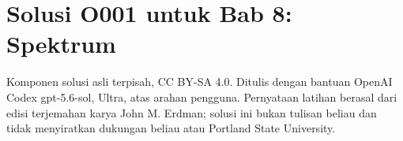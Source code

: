 
\section*{Solusi O001 untuk Bab 8: Spektrum}
\begin{center}
\small
Komponen solusi asli terpisah, CC BY-SA 4.0. Ditulis dengan bantuan
OpenAI Codex gpt-5.6-sol, Ultra, atas arahan pengguna. Pernyataan latihan
berasal dari edisi terjemahan karya John M. Erdman; solusi ini bukan tulisan
beliau dan tidak menyiratkan dukungan beliau atau Portland State University.
\end{center}

